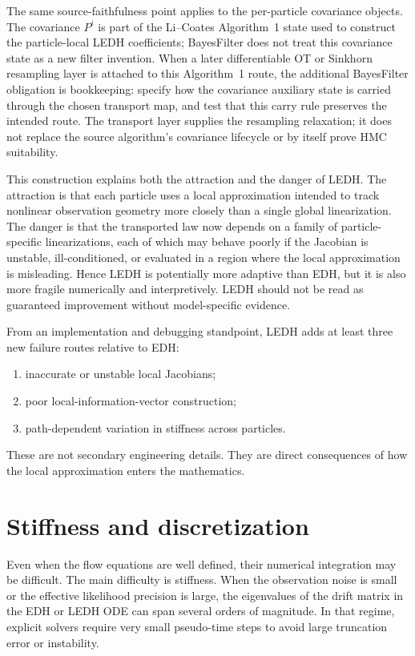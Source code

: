 The same source-faithfulness point applies to the per-particle covariance
objects.  The covariance $P^i$ is part of the Li--Coates Algorithm~1 state used
to construct the particle-local LEDH coefficients; BayesFilter does not treat
this covariance state as a new filter invention.  When a later differentiable
OT or Sinkhorn resampling layer is attached to this Algorithm~1 route, the
additional BayesFilter obligation is bookkeeping: specify how the covariance
auxiliary state is carried through the chosen transport map, and test that this
carry rule preserves the intended route.  The transport layer supplies the
resampling relaxation; it does not replace the source algorithm's covariance
lifecycle or by itself prove HMC suitability.

This construction explains both the attraction and the danger of LEDH.  The
attraction is that each particle uses a local approximation intended to track
nonlinear observation geometry more closely than a single global
linearization.  The danger is that the transported law now depends on a family
of particle-specific linearizations, each of which may behave poorly if the
Jacobian is unstable, ill-conditioned, or evaluated in a region where the local
approximation is misleading.  Hence LEDH is potentially more adaptive than EDH,
but it is also more fragile numerically and interpretively.  LEDH should not be read as guaranteed improvement without model-specific
evidence.

From an implementation and debugging standpoint, LEDH adds at least three new
failure routes relative to EDH:
\begin{enumerate}[label=(\roman*)]
  \item inaccurate or unstable local Jacobians;
  \item poor local-information-vector construction;
  \item path-dependent variation in stiffness across particles.
\end{enumerate}
These are not secondary engineering details.  They are direct consequences of
how the local approximation enters the mathematics.

\section{Stiffness and discretization}
\label{sec:bf-pff-stiffness}

Even when the flow equations are well defined, their numerical integration may
be difficult.  The main difficulty is stiffness.  When the observation noise is
small or the effective likelihood precision is large, the eigenvalues of the
drift matrix in the EDH or LEDH ODE can span several orders of magnitude.  In
that regime, explicit solvers require very small pseudo-time steps to avoid
large truncation error or instability.

